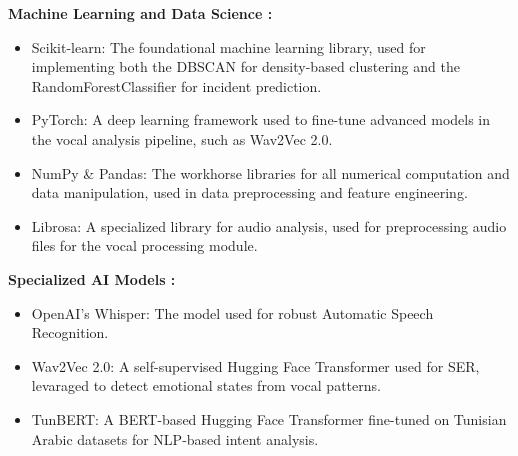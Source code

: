 \documentclass[12pt,a4paper,oneside,english]{book}
\begin{document}
{\textbf{Machine Learning and Data Science :}

\begin{itemize}

\item Scikit-learn: The foundational machine learning library, used for implementing both the DBSCAN for density-based clustering and the RandomForestClassifier for incident prediction.
\item PyTorch: A deep learning framework used to fine-tune advanced models in the vocal analysis pipeline, such as Wav2Vec 2.0.
\item NumPy \& Pandas: The workhorse libraries for all numerical computation and data manipulation, used in data preprocessing and feature engineering.
\item Librosa: A specialized library for audio analysis, used for preprocessing audio files for the vocal processing module.
\end{itemize}

\textbf{Specialized AI Models :}
\begin{itemize}
\item OpenAI's Whisper: The model used for robust Automatic Speech Recognition.
\item Wav2Vec 2.0: A self-supervised Hugging Face Transformer used for SER, levaraged to detect emotional states from vocal patterns.
\item TunBERT: A BERT-based Hugging Face Transformer fine-tuned on Tunisian Arabic datasets for NLP-based intent analysis.%
\end{itemize}

}
\end{document}
